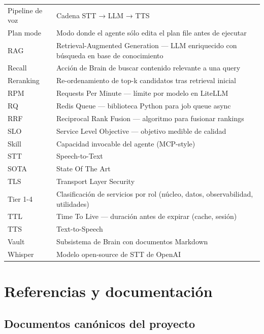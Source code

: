 \documentclass[11pt,a4paper]{article}
\begin{document}
\begin{center}
\begin{longtable}{|l|p{9.5cm}|}
Pipeline de voz & Cadena STT → LLM → TTS\\
Plan mode & Modo donde el agente sólo edita el plan file antes de ejecutar\\
RAG & Retrieval-Augmented Generation — LLM enriquecido con búsqueda en base de conocimiento\\
Recall & Acción de Brain de buscar contenido relevante a una query\\
Reranking & Re-ordenamiento de top-k candidatos tras retrieval inicial\\
RPM & Requests Per Minute — límite por modelo en LiteLLM\\
RQ & Redis Queue — biblioteca Python para job queue async\\
RRF & Reciprocal Rank Fusion — algoritmo para fusionar rankings\\
SLO & Service Level Objective — objetivo medible de calidad\\
Skill & Capacidad invocable del agente (MCP-style)\\
STT & Speech-to-Text\\
SOTA & State Of The Art\\
TLS & Transport Layer Security\\
Tier 1-4 & Clasificación de servicios por rol (núcleo, datos, observabilidad, utilidades)\\
TTL & Time To Live — duración antes de expirar (cache, sesión)\\
TTS & Text-to-Speech\\
Vault & Subsistema de Brain con documentos Markdown\\
Whisper & Modelo open-source de STT de OpenAI\\
\hline
\end{longtable}
\end{center}

\newpage

\section{Referencias y documentación}

\subsection{Documentos canónicos del proyecto}
\end{document}
